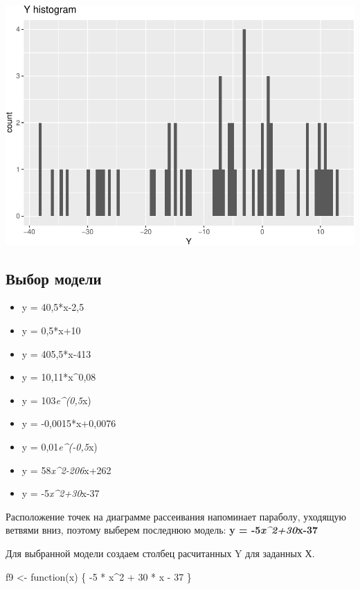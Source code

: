 \documentclass[]{article}
\newenvironment{Shaded}{\begin{snugshade}}{\end{snugshade}}
\newcommand{\DecValTok}[1]{\textcolor[rgb]{0.00,0.00,0.81}{{#1}}}
\newcommand{\StringTok}[1]{\textcolor[rgb]{0.31,0.60,0.02}{{#1}}}
\newcommand{\NormalTok}[1]{{#1}}
\providecommand{\tightlist}{%
  \setlength{\itemsep}{0pt}\setlength{\parskip}{0pt}}
\begin{document}
\includegraphics{DZ3_files/figure-latex/unnamed-chunk-3-1.pdf}

\subsection{Выбор модели}\label{-}

\begin{itemize}
\tightlist
\item
  y = 40,5*x-2,5
\item
  y = 0,5*x+10\\
\item
  y = 405,5*x-413
\item
  y = 10,11*x\^{}0,08\\
\item
  y = 103\emph{e\^{}(0,5}x)\\
\item
  y = -0,0015*x+0,0076\\
\item
  y = 0,01\emph{e\^{}(-0,5}x)\\
\item
  y = 58\emph{x\^{}2-206}x+262\\
\item
  y = -5\emph{x\^{}2+30}x-37
\end{itemize}

Расположение точек на диаграмме рассеивания напоминает параболу,
уходящую ветвями вниз, поэтому выберем последнюю модель: \textbf{y =
-5\emph{x\^{}2+30}x-37}

Для выбранной модели создаем столбец расчитанных Y для заданных Х.

\begin{Shaded}
\begin{Highlighting}[]
\NormalTok{f9 <-}\StringTok{ }\NormalTok{function(x) \{ -}\DecValTok{5} \NormalTok{*}\StringTok{ }\NormalTok{x^}\DecValTok{2} \NormalTok{+}\StringTok{ }\DecValTok{30} \NormalTok{*}\StringTok{ }\NormalTok{x -}\StringTok{ }\DecValTok{37} \NormalTok{\}}
\end{Highlighting}
\end{Shaded}
\end{document}
